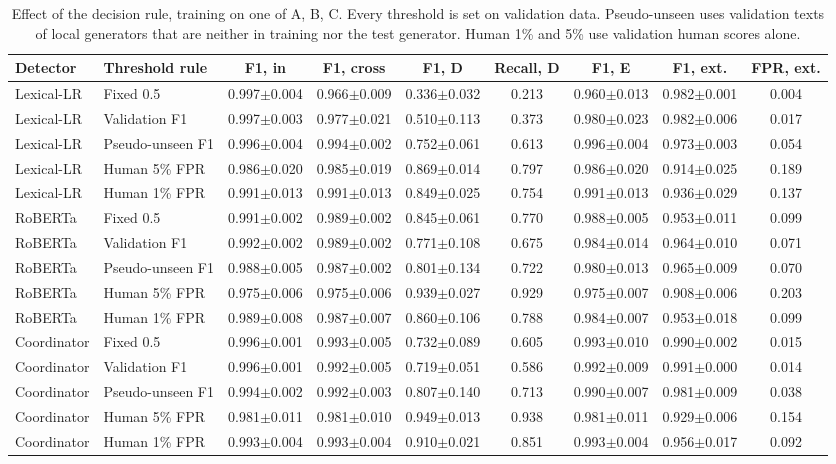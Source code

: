 \begin{table}[t]
\centering
\footnotesize
\caption{Effect of the decision rule, training on one of A, B, C. Every threshold is set on validation data. Pseudo-unseen uses validation texts of local generators that are neither in training nor the test generator. Human 1\% and 5\% use validation human scores alone.}
\label{tab:thresholds}
\begin{tabular}{llccccccc}
\toprule
Detector & Threshold rule & F1, in & F1, cross & F1, D & Recall, D & F1, E & F1, ext. & FPR, ext. \\
\midrule
Lexical-LR & Fixed 0.5 & 0.997$\pm$0.004 & 0.966$\pm$0.009 & 0.336$\pm$0.032 & 0.213 & 0.960$\pm$0.013 & 0.982$\pm$0.001 & 0.004 \\
Lexical-LR & Validation F1 & 0.997$\pm$0.003 & 0.977$\pm$0.021 & 0.510$\pm$0.113 & 0.373 & 0.980$\pm$0.023 & 0.982$\pm$0.006 & 0.017 \\
Lexical-LR & Pseudo-unseen F1 & 0.996$\pm$0.004 & 0.994$\pm$0.002 & 0.752$\pm$0.061 & 0.613 & 0.996$\pm$0.004 & 0.973$\pm$0.003 & 0.054 \\
Lexical-LR & Human 5\% FPR & 0.986$\pm$0.020 & 0.985$\pm$0.019 & 0.869$\pm$0.014 & 0.797 & 0.986$\pm$0.020 & 0.914$\pm$0.025 & 0.189 \\
Lexical-LR & Human 1\% FPR & 0.991$\pm$0.013 & 0.991$\pm$0.013 & 0.849$\pm$0.025 & 0.754 & 0.991$\pm$0.013 & 0.936$\pm$0.029 & 0.137 \\
RoBERTa & Fixed 0.5 & 0.991$\pm$0.002 & 0.989$\pm$0.002 & 0.845$\pm$0.061 & 0.770 & 0.988$\pm$0.005 & 0.953$\pm$0.011 & 0.099 \\
RoBERTa & Validation F1 & 0.992$\pm$0.002 & 0.989$\pm$0.002 & 0.771$\pm$0.108 & 0.675 & 0.984$\pm$0.014 & 0.964$\pm$0.010 & 0.071 \\
RoBERTa & Pseudo-unseen F1 & 0.988$\pm$0.005 & 0.987$\pm$0.002 & 0.801$\pm$0.134 & 0.722 & 0.980$\pm$0.013 & 0.965$\pm$0.009 & 0.070 \\
RoBERTa & Human 5\% FPR & 0.975$\pm$0.006 & 0.975$\pm$0.006 & 0.939$\pm$0.027 & 0.929 & 0.975$\pm$0.007 & 0.908$\pm$0.006 & 0.203 \\
RoBERTa & Human 1\% FPR & 0.989$\pm$0.008 & 0.987$\pm$0.007 & 0.860$\pm$0.106 & 0.788 & 0.984$\pm$0.007 & 0.953$\pm$0.018 & 0.099 \\
Coordinator & Fixed 0.5 & 0.996$\pm$0.001 & 0.993$\pm$0.005 & 0.732$\pm$0.089 & 0.605 & 0.993$\pm$0.010 & 0.990$\pm$0.002 & 0.015 \\
Coordinator & Validation F1 & 0.996$\pm$0.001 & 0.992$\pm$0.005 & 0.719$\pm$0.051 & 0.586 & 0.992$\pm$0.009 & 0.991$\pm$0.000 & 0.014 \\
Coordinator & Pseudo-unseen F1 & 0.994$\pm$0.002 & 0.992$\pm$0.003 & 0.807$\pm$0.140 & 0.713 & 0.990$\pm$0.007 & 0.981$\pm$0.009 & 0.038 \\
Coordinator & Human 5\% FPR & 0.981$\pm$0.011 & 0.981$\pm$0.010 & 0.949$\pm$0.013 & 0.938 & 0.981$\pm$0.011 & 0.929$\pm$0.006 & 0.154 \\
Coordinator & Human 1\% FPR & 0.993$\pm$0.004 & 0.993$\pm$0.004 & 0.910$\pm$0.021 & 0.851 & 0.993$\pm$0.004 & 0.956$\pm$0.017 & 0.092 \\
\bottomrule
\end{tabular}
\end{table}
